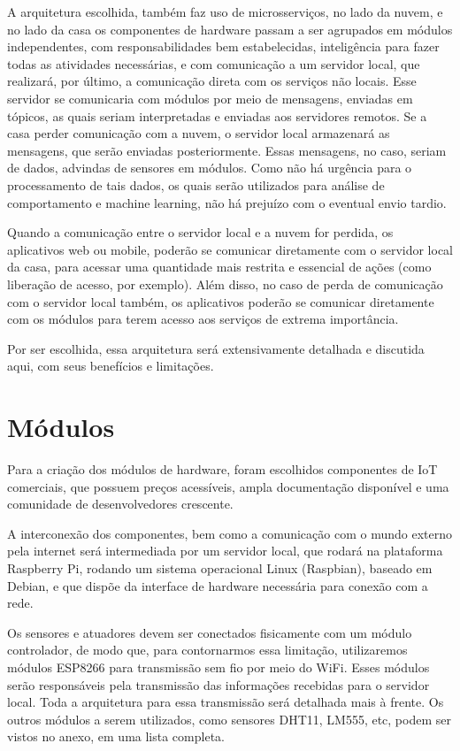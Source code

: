 A arquitetura escolhida, também faz uso de microsserviços, no lado da nuvem, e no lado da casa os componentes de hardware passam a ser agrupados em módulos independentes, com responsabilidades bem estabelecidas, inteligência para fazer todas as atividades necessárias, e com comunicação a um servidor local, que realizará, por último, a comunicação direta com os serviços não locais. Esse servidor se comunicaria com módulos por meio de mensagens, enviadas em tópicos, as quais seriam interpretadas e enviadas aos servidores remotos. Se a casa perder comunicação com a nuvem, o servidor local armazenará as mensagens, que serão enviadas posteriormente. Essas mensagens, no caso, seriam de dados, advindas de sensores em módulos. Como não há urgência para o processamento de tais dados, os quais serão utilizados para análise de comportamento e machine learning, não há prejuízo com o eventual envio tardio.

Quando a comunicação entre o servidor local e a nuvem for perdida, os aplicativos web ou mobile, poderão se comunicar diretamente com o servidor local da casa, para acessar uma quantidade mais restrita e essencial de ações (como liberação de acesso, por exemplo). Além disso, no caso de perda de comunicação com o servidor local também, os aplicativos poderão se comunicar diretamente com os módulos para terem acesso aos serviços de extrema importância.

Por ser escolhida, essa arquitetura será extensivamente detalhada e discutida aqui, com seus benefícios e limitações.

\section{Módulos}
Para a criação dos módulos de hardware, foram escolhidos componentes de IoT comerciais, que possuem preços acessíveis, ampla documentação disponível e uma comunidade de desenvolvedores crescente.

A interconexão dos componentes, bem como a comunicação com o mundo externo pela internet será intermediada por um servidor local, que rodará na plataforma Raspberry Pi, rodando um sistema operacional Linux (Raspbian), baseado em Debian, e que dispõe da interface de hardware necessária para conexão com a rede.

Os sensores e atuadores devem ser conectados fisicamente com um módulo controlador, de modo que, para contornarmos essa limitação, utilizaremos módulos ESP8266 para transmissão sem fio por meio do WiFi. Esses módulos serão responsáveis pela transmissão das informações recebidas para o servidor local. Toda a arquitetura para essa transmissão será detalhada mais à frente. Os outros módulos a serem utilizados, como sensores DHT11, LM555, etc,  podem ser vistos no anexo, em uma lista completa. %

